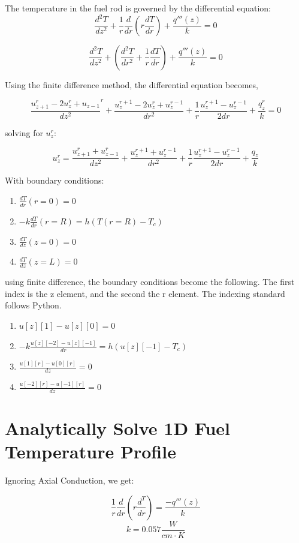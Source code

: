 \documentclass[12pt,letterpaper]{article}
\begin{document}
The temperature in the fuel rod is governed by the differential equation:
\[ \frac{d^2T}{dz^2} + \frac{1}{r} \frac{d}{dr} (r \frac{dT}{dr}) + \frac{q'''(z)}{k} = 0\]

\[ \frac{d^2T}{dz^2} + (\frac{d^2T}{dr^2} + \frac{1}{r} \frac{dT}{dr}) + \frac{q'''(z)}{k} = 0\]

Using the finite difference method, the differential equation becomes,

\[\frac{u_{z+1}^r - 2u_z^r + u_{z-1}}{dz^2}^r + \frac{u^{r+1}_z - 2u^r_z + u^{r-1}_z}{dr^2}
  + \frac{1}{r} \frac{u^{r+1}_z - u^{r-1}_z}{2dr} + \frac{q_z^r}{k} = 0 \]

solving for $u_z^r$:

\[ u_z^r = \frac{u_{z+1}^r + u_{z-1}^r}{dz^2} + \frac{u^{r+1}_z + u^{r-1}_z}{dr^2}
  + \frac{1}{r} \frac{u^{r+1}_z - u^{r-1}_z}{2dr} + \frac{q_z}{k}\]

With boundary conditions:

\begin{enumerate}
    \item $\frac{dT}{dr}(r=0) = 0$
    \item $-k \frac{dT}{dr} (r=R) = h(T(r=R) - T_c)$
    \item $\frac{dT}{dz}(z=0) = 0 $
    \item $\frac{dT}{dz}(z=L) = 0 $
\end{enumerate}

using finite difference, the boundary conditions become the following.
The first index is the z element, and the second the r element. The indexing
standard follows Python.
\begin{enumerate}
    \item $u[z][1]-u[z][0] = 0$
    \item $-k \frac{u[z][-2]-u[z][-1]}{dr} = h(u[z][-1] - T_c)$
    \item $ \frac{u[1][r] - u[0][r]}{dz} = 0$
    \item $\frac{u[-2][r] - u[-1][r]}{dz} = 0 $
\end{enumerate}




\section*{Analytically Solve 1D Fuel Temperature Profile}
Ignoring Axial Conduction, we get:

\[\frac{1}{r} \frac{d}{dr} (r \frac{d^T}{dr}) = \frac{-q'''(z)}{k}\]
\[k = 0.057 \frac{W}{cm\cdot K}\]
\end{document}
